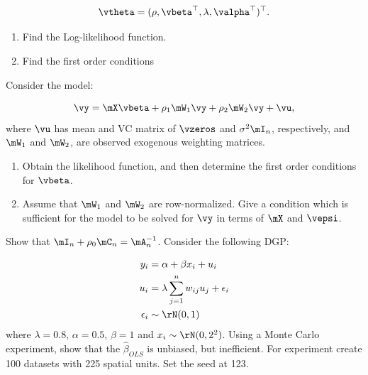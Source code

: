\documentclass[english,12pt]{book}\usepackage[]{graphicx}\usepackage[]{xcolor}
\begin{document}
\begin{exercises}
	\begin{equation}
		\vtheta = (\rho, \vbeta^\top, \lambda, \valpha^\top)^\top.
	\end{equation}
	
   \begin{enumerate}
     \item Find the Log-likelihood function.
     \item Find the first order conditions
   \end{enumerate}
 
 \exercise Consider the model:

\begin{equation}
	\vy = \mX\vbeta + \rho_1\mW_1\vy + \rho_2\mW_2\vy + \vu,
\end{equation}
%
where $\vu$ has mean and VC matrix of $\vzeros$ and $\sigma^2\mI_n$, respectively, and $\mW_1$ and $\mW_2$, are observed exogenous weighting matrices. 
   \begin{enumerate}
    \item Obtain the likelihood function, and then determine the first order conditions for $\vbeta$.
    \item Assume that $\mW_1$ and $\mW_2$ are row-normalized. Give a condition which is sufficient for the model to be solved for $\vy$ in terms of $\mX$ and $\vepsi$.
   \end{enumerate}
   
   \exercise  Show that $\mI_n + \rho_0\mC_n = \mA_n^{-1}$.\label{exercise:expansion-res1}
   \exercise  Consider the following DGP:

\begin{equation}
	\begin{aligned}
		y_i & = \alpha + \beta x_i + u_i \\
		u_i & = \lambda \sum_{j =  1}^n w_{ij}u_{j} + \epsilon_i \\
		\epsilon_i &\sim \rN(0, 1) 
	\end{aligned}
\end{equation}
%
where $\lambda = 0.8$, $\alpha = 0.5$, $\beta = 1$ and $x_i \sim \rN(0, 2^2)$. Using a Monte Carlo experiment, show that the $\widehat{\beta}_{OLS}$ is unbiased, but inefficient. For experiment create 100 datasets with 225 spatial units. Set the seed at 123.


\end{exercises}   
    
    
\end{document}
